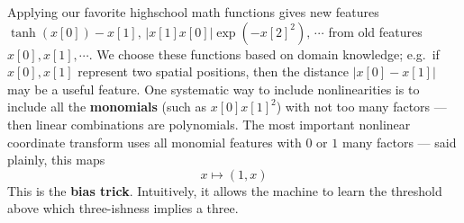 \newpage
{}
    Applying our favorite highschool math functions gives new features
    $
        \tanh(x[0])-x[1],\, |x[1]x[0]| \exp(- x[2]^2),\, \cdots
    $
    from old features $x[0], x[1], \cdots$.
    We choose these functions based on
    domain knowledge; e.g.\ if $x[0], x[1]$ represent two spatial positions,
    then the distance $|x[0]-x[1]|$ may be a useful feature.
    One systematic way to include nonlinearities is to include all
    the \textbf{monomials} (such as $x[0] x[1]^2$) with not too many factors ---
    then linear combinations are polynomials.
    The most important nonlinear coordinate transform uses all monomial
    features with $0$ or $1$ many factors --- said plainly, this maps
    $$
      x \mapsto (1, x)
    $$
    This
    is the \textbf{bias trick}.  Intuitively, it allows the machine to learn
    the threshold above which three-ishness implies a three.
  \begin{marginfigure}[-4cm]
    \centering
    \caption{%
        \textbf{The bias trick helps us model `offset' decision boundaries.}
        Here, the origin is the lower right corner closer to the camera.  Our
        raw inputs $x=(x[0],x[1])$ are $2$-D; we can imagine them
        sitting on the bottom face of the plot (bottom ends of the vertical
        stems).  But, within that face, no line through the origin separates
        the data well.  By contrast, when we use a featurization
        $(1,x[0],x[1])$, our data lies on the top face of the plot; now a plane
        through the origin (shown) successfully separates the data.
    }
  \end{marginfigure}

